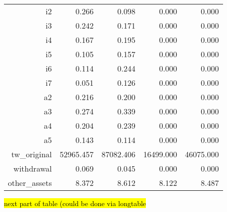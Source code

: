 \documentclass[10pt,a4paper]{article}
\begin{document}
\begin{tiny}
\begin{table}[ht]
\begin{tabular}{rrrrr}
  i2 & 0.266 & 0.098 & 0.000 & 0.000 \\ 
  i3 & 0.242 & 0.171 & 0.000 & 0.000 \\ 
  i4 & 0.167 & 0.195 & 0.000 & 0.000 \\ 
  i5 & 0.105 & 0.157 & 0.000 & 0.000 \\ 
  i6 & 0.114 & 0.244 & 0.000 & 0.000 \\ 
  i7 & 0.051 & 0.126 & 0.000 & 0.000 \\ 
  a2 & 0.216 & 0.200 & 0.000 & 0.000 \\ 
  a3 & 0.274 & 0.339 & 0.000 & 0.000 \\ 
  a4 & 0.204 & 0.239 & 0.000 & 0.000 \\ 
  a5 & 0.143 & 0.114 & 0.000 & 0.000 \\ 
  tw\_original & 52965.457 & 87082.406 & 16499.000 & 46075.000 \\ 
  withdrawal & 0.069 & 0.045 & 0.000 & 0.000 \\ 
  other\_assets & 8.372 & 8.612 & 8.122 & 8.487 \\ 
   \hline
\end{tabular}
\end{table}

\hl{next part of table (could be done via longtable}


\end{tiny}
\end{document}
